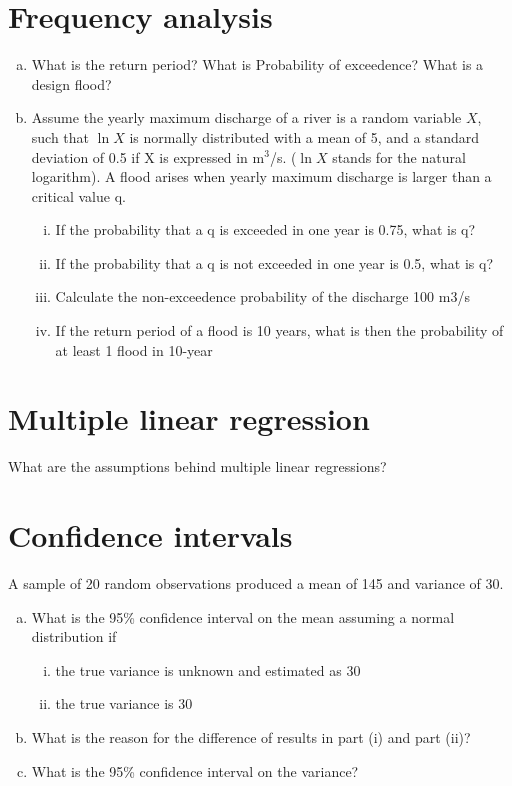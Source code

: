 \documentclass[12pt]{article}
\begin{document}
\section{Frequency analysis}
\begin{enumerate}[(a)] 
\item What is the return period? What is Probability of exceedence? What is a design flood?
\item Assume the yearly maximum discharge of a river is a random variable $X$, such that $\ln X$ is normally distributed with a mean of 5, and a standard deviation of 0.5 if X is expressed in m$^3$/s. ($\ln X$ stands for the natural logarithm). A flood arises when yearly maximum discharge is larger than a critical value q.
 \begin{enumerate}[(i)]
 \item If the probability that a q is exceeded in one year is 0.75, what is q?
 \item If the probability that a q is not exceeded in one year is 0.5, what is q?
 \item Calculate the non-exceedence probability of the discharge 100 m3/s
 \item If the return period of a flood is 10 years, what is then the probability of at least 1 flood in 10-year
 \end{enumerate}
\end{enumerate}


\section{Multiple linear regression}
What are the assumptions behind multiple linear regressions?


\section{Confidence intervals}
A sample of 20 random observations produced a mean of 145 and variance of 30. 
\begin{enumerate}[(a)] 
    \item What is the 95\% confidence interval on the mean assuming a normal distribution if 
    \begin{enumerate}[(i)] 
        \item the true variance is unknown and estimated as 30
        \item the true variance is 30
     \end{enumerate}
    \item What is the reason for the difference of results in part (i) and part (ii)?
    \item What is the 95\% confidence interval on the variance?
\end{enumerate}
\end{document}
